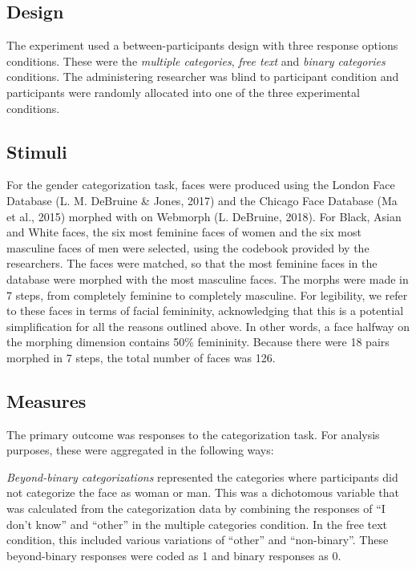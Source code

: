 \documentclass[
  man]{apa7}
\begin{document}
\hypertarget{design}{%
\subsection{Design}\label{design}}

The experiment used a between-participants design with three response options conditions. These were the
\emph{multiple categories}, \emph{free text} and \emph{binary categories} conditions. The administering researcher was blind to participant condition and participants were randomly allocated into one of the three experimental conditions.

\hypertarget{stimuli}{%
\subsection{Stimuli}\label{stimuli}}

For the gender categorization task, faces were produced using the London Face Database (L. M. DeBruine \& Jones, 2017) and the Chicago Face Database (Ma et al., 2015) morphed with on Webmorph (L. DeBruine, 2018). For Black, Asian and White faces, the six most feminine faces of women and the six most masculine faces of men were selected, using the codebook provided by the researchers. The faces were matched, so that the most feminine faces in the database were morphed with the most masculine faces. The morphs were made in 7 steps, from completely feminine to completely masculine. For legibility, we refer to these faces in terms of facial femininity, acknowledging that this is a potential simplification for all the reasons outlined above. In other words, a face halfway on the morphing dimension contains 50\% femininity. Because there were 18 pairs morphed in 7 steps, the total number of faces was 126.

\hypertarget{measures}{%
\subsection{Measures}\label{measures}}

The primary outcome was responses to the categorization task. For analysis purposes, these were aggregated in the following ways:

\emph{Beyond-binary categorizations} represented the categories where participants did not categorize the face as woman or man. This was a dichotomous variable that was calculated from the categorization data by combining the responses of ``I don't know'' and ``other'' in the multiple categories condition. In the free text condition, this included various variations of ``other'' and ``non-binary''. These beyond-binary responses were coded as 1 and binary responses as 0.
\end{document}
